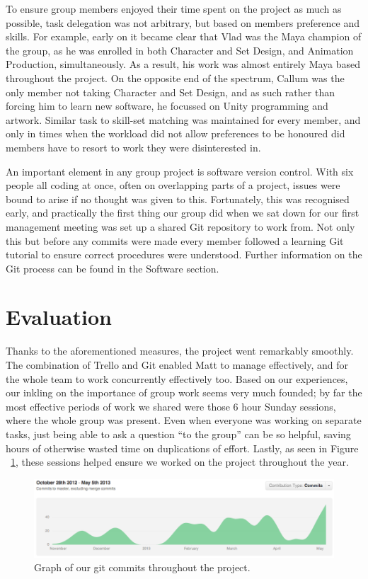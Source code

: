 \documentclass[a4paper,oneside]{memoir}
\begin{document}
		To ensure group members enjoyed their time spent on the project as much as possible, task delegation was not arbitrary, but based on members preference and skills.
		For example, early on it became clear that Vlad was the Maya champion of the group, as he was enrolled in both Character and Set Design, and Animation Production, simultaneously. 
		As a result, his work was almost entirely Maya based throughout the project. 
		On the opposite end of the spectrum, Callum was the only member not taking Character and Set Design, and as such rather than forcing him to learn new software, he focussed on Unity programming and artwork.
		Similar task to skill-set matching was maintained for every member, and only in times when the workload did not allow preferences to be honoured did members have to resort to work they were disinterested in.

		An important element in any group project is software version control. 
		With six people all coding at once, often on overlapping parts of a project, issues were bound to arise if no thought was given to this. 
		Fortunately, this was recognised early, and practically the first thing our group did when we sat down for our first management meeting was set up a shared Git repository to work from. 
		Not only this but before any commits were made every member followed a learning Git tutorial to ensure correct procedures were understood. 
		Further information on the Git process can be found in the Software section.

		\section{Evaluation}

			Thanks to the aforementioned measures, the project went remarkably smoothly. 
			The combination of Trello and Git enabled Matt to manage effectively, and for the whole team to work concurrently effectively too. 
			Based on our experiences, our inkling on the importance of group work seems very much founded; by far the most effective periods of work we shared were those 6 hour Sunday sessions, where the whole group was present.
			Even when everyone was working on separate tasks, just being able to ask a question ``to the group'' can be so helpful, saving hours of otherwise wasted time on duplications of effort.
			Lastly, as seen in Figure ~\ref{fig:GithubGraph}, these sessions helped ensure we worked on the project throughout the year.
			
			\begin{figure}[ht]
				\begin{center}
					\includegraphics[width=150mm]{"../Screenshots/github-graph"}
					\caption{Graph of our git commits throughout the project.}
					\label{fig:GithubGraph}
				\end{center}
			\end{figure}
\end{document}
